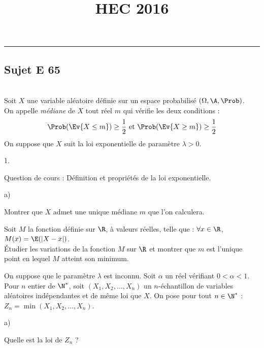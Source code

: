 \documentclass[11pt]{article}
\title{\bf \vspace{-1.6cm} HEC 2016}
\author{}
\date{}
\begin{document}
\maketitle 
\vspace{-1.2cm}\hrule 
\thispagestyle{fancy}

\vspace*{.2cm}


\subsection*{Sujet E 65}


\begin{exerciceAP}~\\
  Soit $X$ une variable aléatoire définie sur un espace probabilisé
  $(\Omega,\A,\Prob)$.\\
  On appelle {\it médiane} de $X$ tout réel $m$ qui vérifie les deux
  conditions :
  \[
  \Prob(\Ev{X\leq m}) \geq \dfrac{1}{2} \ \text{et} \ 
  \Prob(\Ev{X\geq m})\geq \dfrac{1}{2}
  \]
  On suppose que $X$ suit la loi exponentielle de paramètre $\lambda>0$.
  \begin{noliste}{1.}
    \setlength{\itemsep}{2mm}
  \item Question de cours : Définition et propriétés de la loi
    exponentielle.
    
    
  
  \item
    \begin{noliste}{a)}
    \setlength{\itemsep}{2mm}
    \item Montrer que $X$ admet une unique médiane $m$ que l'on
      calculera.
      
    
    
    \item Soit $M$ la fonction définie sur $\R$, à valeurs réelles, 
    telle que : $\forall x\in\R$, $M(x)=\E(\vert X-x\vert)$.\\
    Étudier les variations de la fonction $M$ sur $\R$ et montrer 
    que $m$ est l'unique point en lequel $M$ atteint son minimum.
    
    
  \end{noliste}
  
  \item On suppose que le paramètre $\lambda$ est inconnu. Soit 
  $\alpha$ un réel vérifiant $0<\alpha<1$.\\
  Pour $n$ entier de $\N^*$, soit $(X_1,X_2,\hdots,X_n)$ un 
  $n$-échantillon de variables aléatoires indépendantes et de même loi 
  que $X$. On pose pour tout $n\in\N^*$ : $Z_n = 
  \min(X_1,X_2,\hdots,X_n)$.
  \begin{noliste}{a)}
    \setlength{\itemsep}{2mm}
    \item Quelle est la loi de $Z_n$ ?
    

\end{noliste}
\end{noliste}
\end{exerciceAP}
\end{document}
